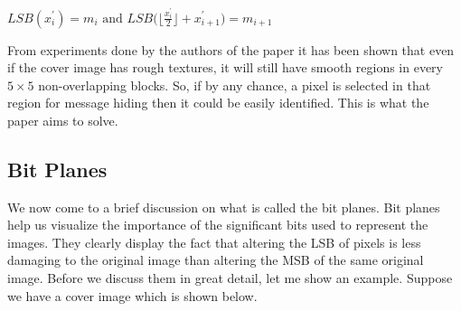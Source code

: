 \documentclass{report}
\begin{document}
\begin{center}
$ \displaystyle LSB(x_{i}^{'})=m_{i} \textrm{ and } LSB \Big( \Big\lfloor{\frac{x_{i}^{'}}{2}}\Big \rfloor + x_{i+1}^{'} \Big) = m_{i+1}$
\end{center}
From experiments done by the authors of the paper it has been shown that even if the cover image has rough textures, it will still have smooth regions in every $5 \times 5$ non-overlapping blocks. So, if by any chance, a pixel is selected in that region for message hiding then it could be easily identified. This is what the paper aims to solve.

\subsection{Bit Planes}
We now come to a brief discussion on what is called the bit planes. Bit planes help us visualize the importance of the significant bits used to represent the images. They clearly display the fact that altering the LSB of pixels is less damaging to the original image than altering the MSB of the same original image. Before we discuss them in great detail, let me show an example. Suppose we have a cover image which is shown below.
\end{document}
